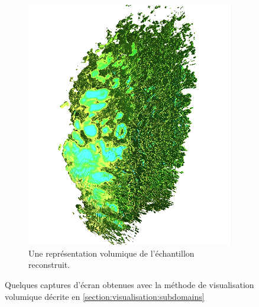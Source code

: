 {{{\begin{figure}[h]
\begin{subfigure}{.48\linewidth}
                    \centering
                    \includegraphics[width=.9\linewidth]{img/results/3D/volumic_02.png}
                    \captionsetup{width=.8\linewidth}
                    \caption{Une représentation volumique de l'échantillon reconstruit.}
                    \label{img:reconstruction:volumic:02}
                \end{subfigure}
                \captionsetup{width=.8\linewidth}
                \caption{Quelques captures d'écran obtenues avec la méthode de visualisation volumique décrite en \ref{section:visualisation:subdomains}}
                \label{img:reconstruction:volumic}
            \end{figure}
        }
    }
}

